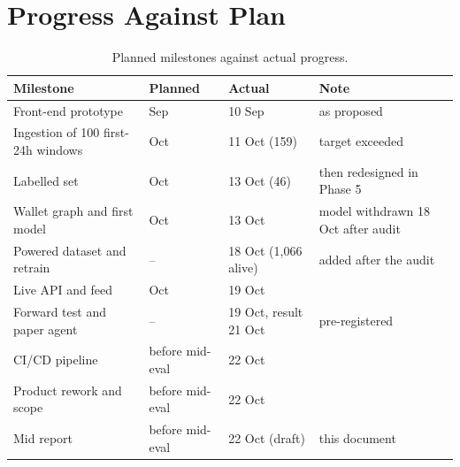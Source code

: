 \section{Progress Against Plan}
\begin{table}[H]
\centering\small
\begin{tabular}{p{}p{}p{}p{}}
\toprule
Milestone & Planned & Actual & Note\\
\midrule
Front-end prototype & Sep & 10 Sep & as proposed\\
Ingestion of 100 first-24h windows & Oct & 11 Oct (159) & target exceeded\\
Labelled set & Oct & 13 Oct (46) & then redesigned in Phase 5\\
Wallet graph and first model & Oct & 13 Oct & model withdrawn 18 Oct after audit\\
Powered dataset and retrain & -- & 18 Oct (1,066 alive) & added after the audit\\
Live API and feed & Oct & 19 Oct & \\
Forward test and paper agent & -- & 19 Oct, result 21 Oct & pre-registered\\
CI/CD pipeline & before mid-eval & 22 Oct & \\
Product rework and scope & before mid-eval & 22 Oct & \\
Mid report & before mid-eval & 22 Oct (draft) & this document\\
\bottomrule
\end{tabular}
\caption{Planned milestones against actual progress.}
\end{table}

